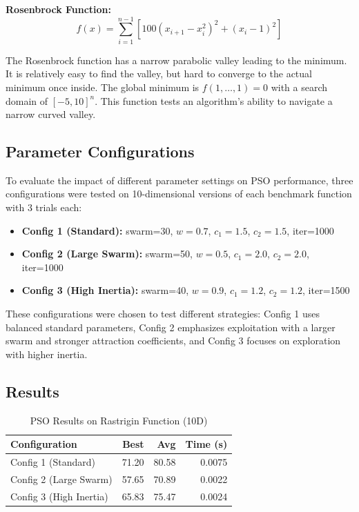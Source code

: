 \documentclass[letterpaper]{article}
\begin{document}
\textbf{Rosenbrock Function:}
\begin{equation}
f(x) = \sum_{i=1}^{n-1} [100(x_{i+1} - x_i^2)^2 + (x_i - 1)^2]
\end{equation}

The Rosenbrock function has a narrow parabolic valley leading to the minimum. It is relatively easy to find the valley, but hard to converge to the actual minimum once inside. The global minimum is $f(1,\ldots,1) = 0$ with a search domain of $[-5, 10]^n$. This function tests an algorithm's ability to navigate a narrow curved valley.

\subsection{Parameter Configurations}

To evaluate the impact of different parameter settings on PSO performance, three configurations were tested on 10-dimensional versions of each benchmark function with 3 trials each:

\begin{itemize}
\item \textbf{Config 1 (Standard):} swarm=30, $w=0.7$, $c_1=1.5$, $c_2=1.5$, iter=1000
\item \textbf{Config 2 (Large Swarm):} swarm=50, $w=0.5$, $c_1=2.0$, $c_2=2.0$, iter=1000
\item \textbf{Config 3 (High Inertia):} swarm=40, $w=0.9$, $c_1=1.2$, $c_2=1.2$, iter=1500
\end{itemize}

These configurations were chosen to test different strategies: Config 1 uses balanced standard parameters, Config 2 emphasizes exploitation with a larger swarm and stronger attraction coefficients, and Config 3 focuses on exploration with higher inertia.

\subsection{Results}

\begin{table}[h]
\centering
\caption{PSO Results on Rastrigin Function (10D)}
\label{tab:pso-rastrigin}
\begin{tabular}{@{}lrrr@{}}
\toprule
\textbf{Configuration} & \textbf{Best} & \textbf{Avg} & \textbf{Time (s)} \\
\midrule
Config 1 (Standard) & 71.20 & 80.58 & 0.0075 \\
Config 2 (Large Swarm) & 57.65 & 70.89 & 0.0022 \\
Config 3 (High Inertia) & 65.83 & 75.47 & 0.0024 \\
\bottomrule
\end{tabular}
\end{table}
\end{document}
